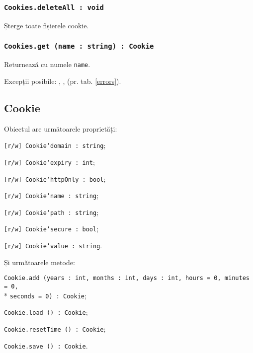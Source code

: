 \subsubsection{\texttt{Cookies.deleteAll : void}}

Șterge toate fișierele cookie.

\subsubsection{\texttt{Cookies.get (name : string) : Cookie}}

Returnează \cookie{} cu numele \texttt{name}.

Excepții posibile: , ,  (pr. tab. \ref{errors}).

\subsection{{\color{orange} Cookie}}

Obiectul \cookie{} are următoarele proprietăți:
\begin{icItems}
	\item \texttt{[r/w] Cookie'domain : string};
	\item \texttt{[r/w] Cookie'expiry : int};
	\item \texttt{[r/w] Cookie'httpOnly : bool};
	\item \texttt{[r/w] Cookie'name : string};
	\item \texttt{[r/w] Cookie'path : string};
	\item \texttt{[r/w] Cookie'secure : bool};
	\item \texttt{[r/w] Cookie'value : string}.
\end{icItems}

Și următoarele metode:
\begin{icItems}
	\item \texttt{Cookie.add (years : int, months : int, days : int, hours = 0, minutes = 0,}\\* \texttt{seconds = 0) : Cookie};
	\item \texttt{Cookie.load () : Cookie};
	\item \texttt{Cookie.resetTime () : Cookie};
	\item \texttt{Cookie.save () : Cookie}.
\end{icItems}

